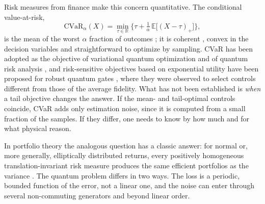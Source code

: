 \documentclass[aps,pra,twocolumn,superscriptaddress,reprint,nofootinbib,floatfix]{revtex4-2}
\theoremstyle{definition}
\newcommand{\cvar}{\mathrm{CVaR}}
\newcommand{\E}{\mathbb{E}}
\begin{document}
Risk measures from finance make this concern quantitative. The conditional
value-at-risk,
\begin{equation}
\cvar_\alpha(X)=\min_{\tau\in\mathbb R}\Big\{\tau+\tfrac1\alpha\,\E\big[(X-\tau)_+\big]\Big\},
\label{eq:ru}
\end{equation}
is the mean of the worst $\alpha$ fraction of outcomes
\cite{Rockafellar2000,Acerbi2002}; it is coherent \cite{Artzner1999}, convex
in the decision variables and straightforward to optimize by sampling. CVaR
has been adopted as the objective of variational quantum optimization
\cite{Barkoutsos2020} and of quantum risk analysis \cite{Woerner2019}, and
risk-sensitive objectives based on exponential utility have been proposed
for robust quantum gates \cite{Ge2021}, where they were observed to select
controls different from those of the average fidelity. What has not been
established is \emph{when} a tail objective changes the answer. If the mean-
and tail-optimal controls coincide, CVaR adds only estimation noise, since it
is computed from a small fraction of the samples. If they differ, one needs
to know by how much and for what physical reason.

In portfolio theory the analogous question has a classic answer: for normal
or, more generally, elliptically distributed returns, every positively
homogeneous translation-invariant risk measure produces the same efficient
portfolios as the variance
\cite{Rockafellar2000,Embrechts2002}. The quantum problem differs in two
ways. The loss is a periodic, bounded function of the error, not a linear
one, and the noise can enter through several non-commuting generators and
beyond linear order.
\end{document}
